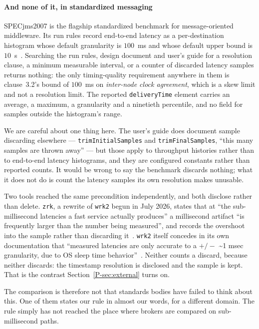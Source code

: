 \documentclass[10pt,journal,onecolumn]{IEEEtran}
\newcommand{\mainModeB}{\ref{P-sec:external}}              %
\begin{document}
\paragraph{And none of it, in standardized messaging}
SPECjms2007 is the flagship standardized benchmark for message-oriented middleware. Its run
rules record end-to-end latency as a per-destination histogram whose default granularity is
$100$~ms and whose default upper bound is $10$~s~\cite{specjms2007,sachs2009specjms}. Searching
the run rules, design document and user's guide for a resolution clause, a minimum measurable
interval, or a counter of discarded latency samples returns nothing: the only timing-quality
requirement anywhere in them is clause~3.2's bound of $100$~ms on \emph{inter-node clock
agreement}, which is a skew limit and not a resolution limit. The reported
\texttt{deliveryTime} element carries an average, a maximum, a granularity and a ninetieth
percentile, and no field for samples outside the histogram's range.

We are careful about one thing here. The user's guide does document sample discarding
elsewhere --- \texttt{trimInitialSamples} and \texttt{trimFinalSamples}, ``this many samples
are thrown away'' --- but those apply to throughput histories rather than to end-to-end latency
histograms, and they are configured constants rather than reported counts. It would be wrong
to say the benchmark discards nothing; what it does not do is count the latency samples its
own resolution makes unusable.

Two tools reached the same precondition independently, and both disclose rather than delete. \texttt{zrk}, a rewrite of \texttt{wrk2} begun in July 2026, states that at ``the sub-millisecond latencies a fast service actually produces'' a millisecond artifact ``is frequently larger than the number being measured'', and records the overshoot into the sample rather than discarding it~\cite{zrk2026}. \texttt{wrk2} itself concedes in its own documentation that ``measured latencies are only accurate to a $+/-$ \textasciitilde 1 msec granularity, due to OS sleep time behavior''~\cite{wrk2}. Neither counts a discard, because neither discards: the timestamp resolution is disclosed and the sample is kept. That is the contrast Section~\mainModeB{} turns on.

The comparison is therefore not that standards bodies have failed to think about this. One of
them states our rule in almost our words, for a different domain. The rule simply has not
reached the place where brokers are compared on sub-millisecond paths.
\end{document}
